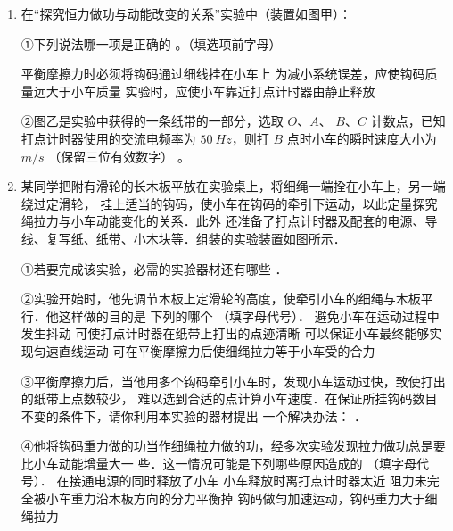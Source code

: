 \begin{enumerate}
\begin{enumerate}
\end{enumerate}



\newpage
\item
{}
在“探究恒力做功与动能改变的关系”实验中（装置如图甲）：
\begin{figure}[h!]
\centering
 \qquad 
  
\end{figure}


①下列说法哪一项是正确的
。（填选项前字母）

\threechoices
{平衡摩擦力时必须将钩码通过细线挂在小车上}
{为减小系统误差，应使钩码质量远大于小车质量}
{实验时，应使小车靠近打点计时器由静止释放}

②图乙是实验中获得的一条纸带的一部分，选取 $ O $、$ A $、
$ B $、$ C $ 计数点，已知打点计时器使用的交流电频率为 $ 50 \ Hz $，则打 $ B $ 点时小车的瞬时速度大小为
$ m/s $
（保留三位有效数字）
。


\newpage
\item 
{}
某同学把附有滑轮的长木板平放在实验桌上，将细绳一端拴在小车上，另一端绕过定滑轮，
挂上适当的钩码，使小车在钩码的牵引下运动，以此定量探究绳拉力与小车动能变化的关系．此外
还准备了打点计时器及配套的电源、导线、复写纸、纸带、小木块等．组装的实验装置如图所示．
\begin{figure}[h!]
\centering

\end{figure}


①若要完成该实验，必需的实验器材还有哪些  ．

②实验开始时，他先调节木板上定滑轮的高度，使牵引小车的细绳与木板平行．他这样做的目的是
下列的哪个  （填字母代号）．
\fourchoices
{避免小车在运动过程中发生抖动}
{可使打点计时器在纸带上打出的点迹清晰}
{可以保证小车最终能够实现匀速直线运动}
{可在平衡摩擦力后使细绳拉力等于小车受的合力}

③平衡摩擦力后，当他用多个钩码牵引小车时，发现小车运动过快，致使打出的纸带上点数较少，
难以选到合适的点计算小车速度．在保证所挂钩码数目不变的条件下，请你利用本实验的器材提出
一个解决办法：  ．


④他将钩码重力做的功当作细绳拉力做的功，经多次实验发现拉力做功总是要比小车动能增量大一
些．这一情况可能是下列哪些原因造成的  （填字母代号）．
\fourchoices
{在接通电源的同时释放了小车}
{小车释放时离打点计时器太近}
{阻力未完全被小车重力沿木板方向的分力平衡掉}
{钩码做匀加速运动，钩码重力大于细绳拉力}



\end{enumerate}

